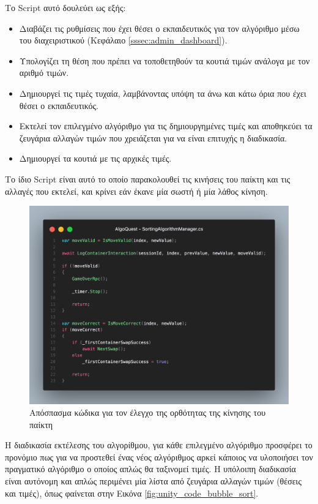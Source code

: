 Tο Script αυτό δουλεύει ως εξής:
\begin{itemize}
    \item Διαβάζει τις ρυθμίσεις που έχει θέσει ο εκπαιδευτικός για τον αλγόριθμο μέσω του διαχειριστικού (Κεφάλαιο \ref{sssec:admin_dashboard}).
    \item Υπολογίζει τη θέση που πρέπει να τοποθετηθούν τα κουτιά τιμών ανάλογα με τον αριθμό τιμών.
    \item Δημιουργεί τις τιμές τυχαία, λαμβάνοντας υπόψη τα άνω και κάτω όρια που έχει θέσει ο εκπαιδευτικός.
    \item Εκτελεί τον επιλεγμένο αλγόριθμο για τις δημιουργημένες τιμές και αποθηκεύει τα ζευγάρια αλλαγών τιμών που χρειάζεται για να είναι επιτυχής η διαδικασία.
    \item Δημιουργεί τα κουτιά με τις αρχικές τιμές.
\end{itemize}

Το ίδιο Script είναι αυτό το οποίο παρακολουθεί τις κινήσεις του παίκτη και τις αλλαγές που εκτελεί, και κρίνει εάν έκανε μία σωστή ή μία λάθος κίνηση.

\begin{figure}[H]
    \centering
    \includegraphics[width=0.8\linewidth]{sections/4/2/images/unity_code_sorting_algorithm_manager_move_valid}
    \caption{Απόσπασμα κώδικα για τον έλεγχο της ορθότητας της κίνησης του παίκτη}
    \label{fig:unity_code_sorting_algorithm_manager_move_valid}
\end{figure}

Η διαδικασία εκτέλεσης του αλγορίθμου, για κάθε επιλεγμένο αλγόριθμο προσφέρει το προνόμιο πως για να προστεθεί ένας νέος αλγόριθμος αρκεί κάποιος να υλοποιήσει τον πραγματικό αλγόριθμο ο οποίος απλώς θα ταξινομεί τιμές. Η υπόλοιπη διαδικασία είναι αυτόνομη και απλώς περιμένει μία λίστα από ζευγάρια αλλαγών τιμών (θέσεις και τιμές), όπως φαίνεται στην Εικόνα \ref{fig:unity_code_bubble_sort}.

